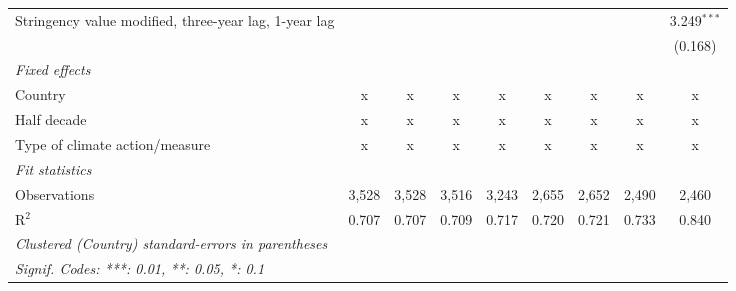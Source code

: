 \begin{table}[htbp]
\begin{tabular}{lcccccccc}
      Stringency value modified, three-year lag, 1-year lag                                  &              &              &               &               &               &               &              & 3.249$^{***}$\\   
                                                                                             &              &              &               &               &               &               &              & (0.168)\\   
      \emph{Fixed effects}\\
      Country                                                                                & x            & x            & x             & x             & x             & x             & x            & x\\  
      Half decade                                                                            & x            & x            & x             & x             & x             & x             & x            & x\\  
      Type of climate action/measure                                                         & x            & x            & x             & x             & x             & x             & x            & x\\  
      \midrule \emph{Fit statistics}\\
      Observations                                                                           & 3,528        & 3,528        & 3,516         & 3,243         & 2,655         & 2,652         & 2,490        & 2,460\\  
      R$^2$                                                                                  & 0.707        & 0.707        & 0.709         & 0.717         & 0.720         & 0.721         & 0.733        & 0.840\\  
      \midrule
      \multicolumn{9}{l}{\emph{Clustered (Country) standard-errors in parentheses}}\\
      \multicolumn{9}{l}{\emph{Signif. Codes: ***: 0.01, **: 0.05, *: 0.1}}\\
   \end{tabular}
\end{table}


